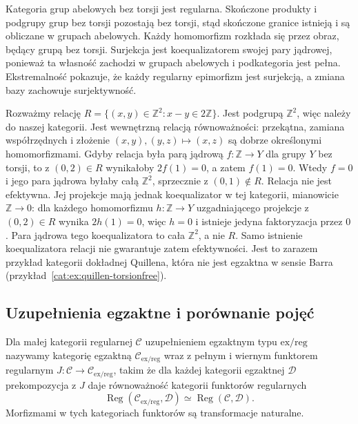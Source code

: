 \begin{przyklad}\label{cat:ex:barr-torsionfree}
Kategoria grup abelowych bez torsji jest regularna. Skończone produkty i podgrupy grup bez torsji pozostają bez torsji, stąd skończone granice istnieją i są obliczane w grupach abelowych. Każdy homomorfizm rozkłada się przez obraz, będący grupą bez torsji. Surjekcja jest koequalizatorem swojej pary jądrowej, ponieważ ta własność zachodzi w grupach abelowych i podkategoria jest pełna. Ekstremalność pokazuje, że każdy regularny epimorfizm jest surjekcją, a zmiana bazy zachowuje surjektywność.

Rozważmy relację $R=\{(x,y)\in\mathbb Z^2:x-y\in2\mathbb Z\}$. Jest podgrupą $\mathbb Z^2$, więc należy do naszej kategorii. Jest wewnętrzną relacją równoważności: przekątna, zamiana współrzędnych i złożenie $(x,y),(y,z)\mapsto(x,z)$ są dobrze określonymi homomorfizmami. Gdyby relacja była parą jądrową $f:\mathbb Z\to Y$ dla grupy $Y$ bez torsji, to z $(0,2)\in R$ wynikałoby $2f(1)=0$, a zatem $f(1)=0$. Wtedy $f=0$ i jego para jądrowa byłaby całą $\mathbb Z^2$, sprzecznie z $(0,1)\notin R$. Relacja nie jest efektywna. Jej projekcje mają jednak koequalizator w tej kategorii, mianowicie $\mathbb Z\to0$: dla każdego homomorfizmu $h:\mathbb Z\to Y$ uzgadniającego projekcje z $(0,2)\in R$ wynika $2h(1)=0$, więc $h=0$ i istnieje jedyna faktoryzacja przez $0$. Para jądrowa tego koequalizatora to cała $\mathbb Z^2$, a nie $R$. Samo istnienie koequalizatora relacji nie gwarantuje zatem efektywności. Jest to zarazem przykład kategorii dokładnej Quillena, która nie jest egzaktna w sensie Barra (przykład~\ref{cat:ex:quillen-torsionfree}).
\end{przyklad}

\subsection{Uzupełnienia egzaktne i porównanie pojęć}

\begin{definicja}\label{cat:def:barr-exact-completion}
Dla małej kategorii regularnej $\mathcal C$ uzupełnieniem egzaktnym typu $\mathrm{ex/reg}$ nazywamy kategorię egzaktną $\mathcal C_{\mathrm{ex/reg}}$ wraz z pełnym i wiernym funktorem regularnym $J:\mathcal C\to\mathcal C_{\mathrm{ex/reg}}$, takim że dla każdej kategorii egzaktnej $\mathcal D$ prekompozycja z $J$ daje równoważność kategorii funktorów regularnych
\[
 \operatorname{Reg}(\mathcal C_{\mathrm{ex/reg}},\mathcal D)
 \simeq \operatorname{Reg}(\mathcal C,\mathcal D).
\]
Morfizmami w tych kategoriach funktorów są transformacje naturalne.
\end{definicja}

